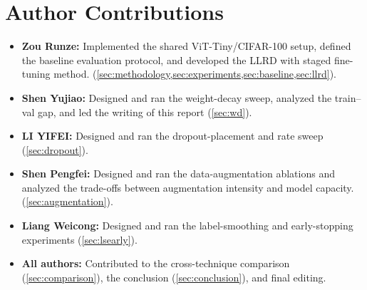 \section*{Author Contributions}
\label{sec:contributions}


\begin{itemize}
  \item \textbf{Zou Runze:} Implemented the shared ViT-Tiny/CIFAR-100 setup, defined the baseline evaluation protocol, and developed the LLRD with staged fine-tuning method.
        (\cref{sec:methodology,sec:experiments,sec:baseline,sec:llrd}).
  \item \textbf{Shen Yujiao:} Designed and ran the weight-decay sweep,
        analyzed the train--val gap, and led the writing of this
        report (\cref{sec:wd}).
  \item \textbf{LI YIFEI:} Designed and ran the dropout-placement and
        rate sweep (\cref{sec:dropout}).
  \item \textbf{Shen Pengfei:} Designed and ran the data-augmentation
        ablations and analyzed the trade-offs between augmentation intensity and model capacity.
        (\cref{sec:augmentation}).
  \item \textbf{Liang Weicong:} Designed and ran the label-smoothing and
        early-stopping experiments (\cref{sec:lsearly}).
  \item \textbf{All authors:} Contributed to the cross-technique
        comparison (\cref{sec:comparison}), the conclusion
        (\cref{sec:conclusion}), and final editing.
\end{itemize}

